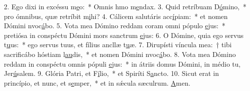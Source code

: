 2. Ego dixi in excéssu m\uline{e}o:~* Omnis hmo m\uline{e}ndax.
3. Quid retríbuam D\uline{ó}mino,~* pro ómnibus, quæ retríbit m\uline{i}hi?
4. Cálicem salutáris acc\uline{í}piam:~* et nomen Dómini nvoc\uline{á}bo.
5. Vota mea Dómino reddam coram omni pópulo \uline{e}jus:~* pretiósa in conspéctu Dómini mors sanctrum \uline{e}jus:
6. O Dómine, quia ego servus t\uline{u}us:~* ego servus tuus, et fílius ancllæ t\uline{u}æ.
7. Dirupísti víncula mea:~† tibi sacrificábo hóstiam l\uline{au}dis,~* et nomen Dómini nvoc\uline{á}bo.
8. Vota mea Dómino reddam in conspéctu omnis pópuli \uline{e}jus:~* in átriis domus Dómini, in médio tu, Jer\uline{ú}salem.
9. Glória Patri, et F\uline{í}lio,~* et Spiríti S\uline{a}ncto.
10. Sicut erat in princípio, et nunc, et s\uline{e}mper,~* et in sǽcula sæculrum. \uline{A}men.
